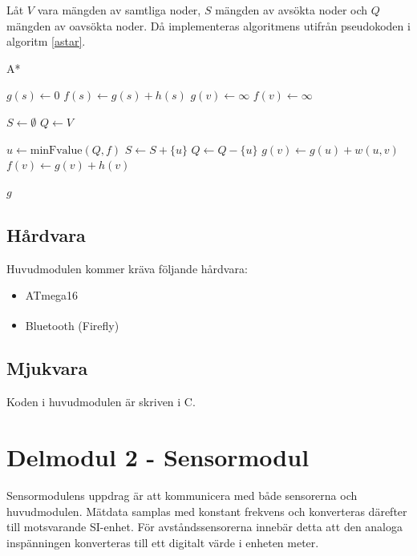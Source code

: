 \documentclass[11pt]{article}
\begin{document}
\begin{flushleft}
Låt $V$ vara mängden av samtliga noder, $S$ mängden av avsökta noder och $Q$ mängden av oavsökta noder. Då implementeras algoritmens utifrån pseudokoden i algoritm \ref{astar}.

\begin{algorithm}[H]
	\caption{A*} \label{astar}
	\begin{algorithmic}[1]
			\State $g(s) \gets 0$
			\State $f(s) \gets g(s) + h(s)$
				\State $g(v) \gets \infty$
				\State $f(v) \gets \infty$
			\EndFor
			
			\State $S \gets \emptyset$
			\State $Q \gets V$
			
				\State $u \gets \textrm{minFvalue}(Q,f)$%
				\State $S \gets S +  \{ u\}$
				\State $Q \gets Q - \{ u\}$
						\State $g(v) \gets g(u) + w(u,v)$
						\State $f(v) \gets g(v) + h(v)$
					\EndIf
				\EndFor
			\EndWhile
			
			\Return $g$
		\EndFunction
	\end{algorithmic}
\end{algorithm}
  

\subsection{Hårdvara}
Huvudmodulen kommer kräva följande hårdvara:
\begin{itemize}
	\item ATmega16
	\item  Bluetooth\textsuperscript{\circledR}  (Firefly)
\end{itemize}


\subsection{Mjukvara}
Koden i huvudmodulen är skriven i C. 

\pagebreak
\section{Delmodul 2 - Sensormodul}
Sensormodulens uppdrag är att kommunicera med både sensorerna och huvudmodulen. Mätdata samplas med konstant frekvens och konverteras därefter till motsvarande SI-enhet. För avståndssensorerna innebär detta att den analoga inspänningen konverteras till ett digitalt värde i enheten meter.


\end{flushleft}
\end{document}
